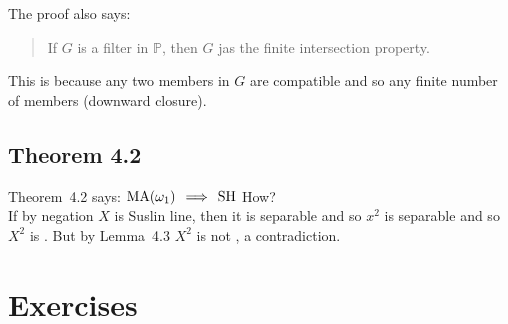 The proof also says:
\vspace{-10pt}
\begin{quote}
If $G$ is a filter in \(\mathds{P}\), then $G$ jas the 
finite intersection property.
\end{quote}
This is because any two members in $G$
are compatible and so any finite number of members
(downward closure).

\subsection{Theorem 4.2}

Theorem~4.2 says: \(\mathop{\rm MA}\nolimits(\omega_1) \,\implies\, \mathop{\rm SH}\nolimits\)
How?\\
If by negation $X$ is Suslin line, then it is separable
and so \(x^2\) is separable and so \(X^2\) is \ccc.
But by Lemma~4.3 \(X^2\) is not \ccc, a contradiction.

\section{Exercises}

